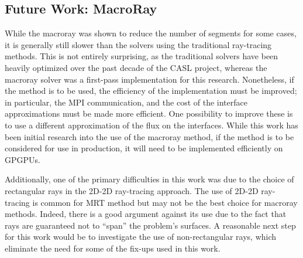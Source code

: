 {{    \subsection{Future Work: MacroRay}{\label{ssec:Future Work:MacroRay}
      While the macroray was shown to reduce the number of segments for some cases, it is generally still slower than the solvers using the traditional ray-tracing methods.
      This is not entirely surprising, as the traditional solvers have been heavily optimized over the past decade of the \ac{CASL} project, whereas the macroray solver was a first-pass implementation for this research.
      Nonetheless, if the method is to be used, the efficiency of the implementation must be improved; in particular, the MPI communication, and the cost of the interface approximations must be made more efficient.
      One possibility to improve these is to use a different approximation of the flux on the interfaces.
      While this work has been initial research into the use of the macroray method, if the method is to be considered for use in production, it will need to be implemented efficiently on \acp{GPGPU}.

      Additionally, one of the primary difficulties in this work was due to the choice of rectangular rays in the 2D-2D ray-tracing approach.
      The use of 2D-2D ray-tracing is common for \ac{MRT} method but may not be the best choice for macroray methods.
      Indeed, there is a good argument against its use due to the fact that rays are guaranteed not to ``span'' the problem's surfaces.
      A reasonable next step for this work would be to investigate the use of non-rectangular rays, which eliminate the need for some of the fix-ups used in this work.
    }
  }

  \printbibliography
}